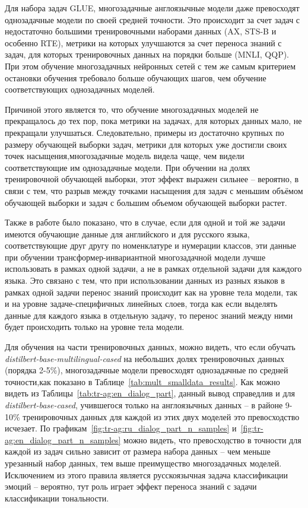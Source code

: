 Для набора задач GLUE, многозадачные англоязычные модели даже превосходят однозадачные модели по своей средней точности. Это происходит за счет задач с недостаточно большими тренировочными наборами данных (AX, STS-B и особенно RTE), метрики на которых улучшаются за счет переноса знаний с задач, для которых тренировочных данных на порядки больше (MNLI, QQP).
При этом обучение многозадачных нейронных сетей с тем же самым критерием остановки обучения требовало больше обучающих шагов, чем обучение соответствующих однозадачных моделей.

Причиной этого является то, что обучение многозадачных моделей не прекращалось до тех пор, пока метрики на задачах, для которых данных мало, не прекращали улучшаться.
Следовательно, примеры из достаточно крупных по размеру обучающей выборки задач, метрики для которых уже достигли своих точек насыщения,многозадачные модель видела чаще, чем видели соответствующие им однозадачные модели. При обучении на долях тренировочной обучающей выборки, этот эффект выражен сильнее -- вероятно, в связи с тем, что разрыв между точками насыщения для задач с меньшим объёмом обучающей выборки и задач с большим объемом обучающей выборки растет.

Также в работе было показано, что в случае, если для одной и той же задачи имеются обучающие данные для английского и для русского языка, соответствующие друг другу по номенклатуре и нумерации классов, эти данные при обучении трансформер-инвариантной многозадачной модели лучше использовать в рамках одной задачи, а не в рамках отдельной задачи для каждого языка. Это связано с тем, что при использовании данных из разных языков в рамках одной задачи перенос знаний происходит как на уровне тела модели, так и на уровне задаче-специфичных линейных слоев, тогда как если выделять данные для каждого языка в отдельную задачу, то перенос знаний между ними будет происходить только на уровне тела модели.

Для обучения на части тренировочных данных, можно видеть, что если обучать \textit{distilbert-base-multilingual-cased} на небольших долях тренировочных данных (порядка 2-5\%), многозадачные модели превосходят однозадачные по средней точности,как показано в Таблице~\ref{tab:mult_smalldata_results}. Как можно видеть из Таблицы~\ref{tab:tr-ag:en_dialog_part}, данный вывод справедлив и для \textit{distilbert-base-cased}, учившегося только на англоязычных данных -- в районе 9-10\% тренировочных данных для каждой из этих двух моделей это превосходство исчезает. По графикам~\ref{fig:tr-ag:ru_dialog_part_n_samples} и~\ref{fig:tr-ag:en_dialog_part_n_samples} можно видеть, что превосходство в точности для каждой из задач сильно зависит от размера набора данных -- чем меньше урезанный набор данных, тем выше преимущество многозадачных моделей. Исключением из этого правила является русскоязычная задача классификации эмоций -- вероятно, тут роль играет эффект переноса знаний с задачи классификации тональности.

